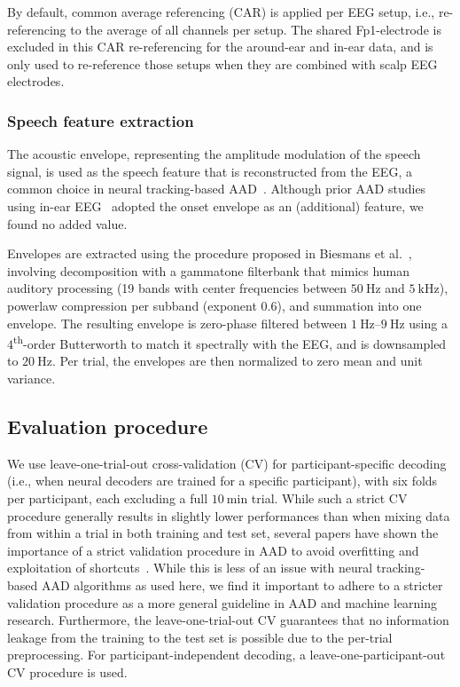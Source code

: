 \documentclass[fleqn,10pt]{wlscirep}
\begin{document}
	By default, common average referencing (CAR) is applied per EEG setup, i.e., re-referencing to the average of all channels per setup. The shared Fp1-electrode is excluded in this CAR re-referencing for the around-ear and in-ear data, and is only used to re-reference those setups when they are combined with scalp EEG electrodes.
	
	\subsubsection*{Speech feature extraction}
	The acoustic envelope, representing the amplitude modulation of the speech signal, is used as the speech feature that is reconstructed from the EEG, a common choice in neural tracking-based AAD~\cite{osullivan2014attentional,mirkovic2015decoding,geirnaert2021eegBased}. Although prior AAD studies using in-ear EEG~\cite{fiedler2017single,thornton2024comparison} adopted the onset envelope as an (additional) feature, we found no added value.
	
	Envelopes are extracted using the procedure proposed in Biesmans et al.~\cite{biesmans2017auditory}, involving decomposition with a gammatone filterbank that mimics human auditory processing (19 bands with center frequencies between $\SI{50}{\hertz}$ and $\SI{5}{\kilo\hertz}$), powerlaw compression per subband (exponent $0.6$), and summation into one envelope. The resulting envelope is zero-phase filtered between $\SIrange{1}{9}{\hertz}$ using a $4$\textsuperscript{th}-order Butterworth to match it spectrally with the EEG, and is downsampled to $\SI{20}{\hertz}$. Per trial, the envelopes are then normalized to zero mean and unit variance.
	
	\subsection*{Evaluation procedure}
	We use leave-one-trial-out cross-validation (CV) for participant-specific decoding (i.e., when neural decoders are trained for a specific participant), with six folds per participant, each excluding a full $\SI{10}{\minute}$ trial. While such a strict CV procedure generally results in slightly lower performances than when mixing data from within a trial in both training and test set, several papers have shown the importance of a strict validation procedure in AAD to avoid overfitting and exploitation of shortcuts~\cite{puffay2023relating,rotaru2023what,ivucic2024impact}. While this is less of an issue with neural tracking-based AAD algorithms as used here, we find it important to adhere to a stricter validation procedure as a more general guideline in AAD and machine learning research. Furthermore, the leave-one-trial-out CV guarantees that no information leakage from the training to the test set is possible due to the per-trial preprocessing. For participant-independent decoding, a leave-one-participant-out CV procedure is used.
	
\end{document}
